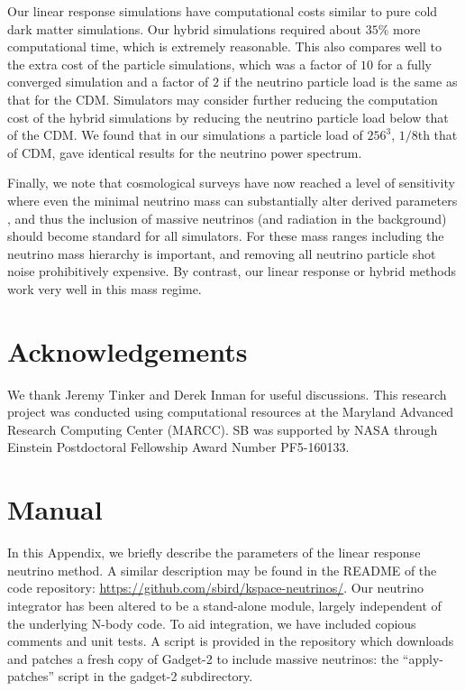 \documentclass[useAMS, usenatbib]{mnras}
\begin{document}
Our linear response simulations have computational costs similar to pure cold dark matter simulations. Our hybrid simulations required about $35\%$ more computational time, which is extremely reasonable. This also compares well to the extra cost of the particle simulations, which was a factor of $10$ for a fully converged simulation and a factor of $2$ if the neutrino particle load is the same as that for the CDM. Simulators may consider further reducing the computation cost of the hybrid simulations by reducing the neutrino particle load below that of the CDM. We found that in our simulations a particle load of $256^3$, $1/8$th that of CDM, gave identical results for the neutrino power spectrum.

Finally, we note that cosmological surveys have now reached a level of sensitivity where even the minimal neutrino mass can substantially alter derived parameters \citep{Calabrese_2017}, and thus the inclusion of massive neutrinos (and radiation in the background) should become standard for all simulators. For these mass ranges including the neutrino mass hierarchy is important, and removing all neutrino particle shot noise prohibitively expensive. By contrast, our linear response or hybrid methods work very well in this mass regime.

\section*{Acknowledgements}

We thank Jeremy Tinker and Derek Inman for useful discussions.
This research project was conducted using computational resources
at the Maryland Advanced Research Computing Center (MARCC). SB was supported by NASA through
Einstein Postdoctoral Fellowship Award Number PF5-160133.

\appendix

\section{Manual}
\label{sec:manual}

In this Appendix, we briefly describe the parameters of the linear response neutrino method. A similar description may be found in the README of the code repository: \url{https://github.com/sbird/kspace-neutrinos/}. Our neutrino integrator has been altered to be a stand-alone module, largely independent of the underlying N-body code. To aid integration, we have included copious comments and unit tests. A script is provided in the repository which downloads and patches a fresh copy of Gadget-2 to include massive neutrinos: the ``apply-patches'' script in the gadget-2 subdirectory.
\end{document}
